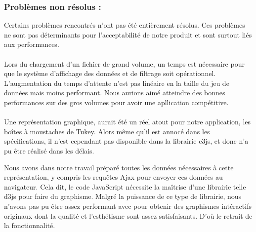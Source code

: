 			\subsubsection*{Problèmes non résolus :}
				Certains problèmes rencontrés n'ont pas été entièrement résolus. Ces problèmes ne sont pas déterminants pour l'acceptabilité de notre produit et sont surtout liés aux performances.
				\paragraph{}Lors du chargement d'un fichier de grand volume, un temps est nécessaire pour que le système d'affichage des données et de filtrage soit opérationnel. L'augmentation du temps d'attente n'est pas linéaire en la taille du jeu de données mais moins performant. Nous aurions aimé atteindre des bonnes performances sur des gros volumes pour avoir une apllication compétitive.
				\paragraph{}Une représentation graphique, aurait été un réel atout pour notre application, les boîtes à moustaches de Tukey.
				Alors même qu'il est annocé dans les spécifications, il n'est cependant pas disponible dans la librairie c3js, et donc n'a pu être réalisé dans les délais.
						
				Nous avons dans notre travail préparé toutes les données nécessaires à cette représentation, y compris les requêtes Ajax pour envoyer ces données au navigateur.
				Cela dit, le code JavaScript nécessite la maîtrise d'une librairie telle d3js pour faire du graphisme. Malgré la puissance de ce type de librairie, nous n'avons pas pu être assez performant avec pour obtenir des graphismes intéractifs originaux dont la qualité et l'esthétisme sont assez satisfaisants. D'où le retrait de la fonctionnalité.
				
		
				
